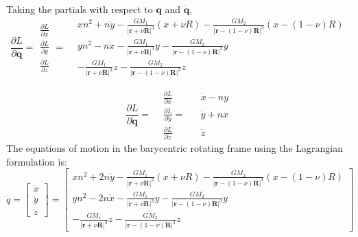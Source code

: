 \documentclass[]{aiaa-tc}%
\begin{document}
Taking the partials with respect to $\mathbf{q}$ and $\mathbf{\dot{q}}$,
\begin{equation}
\frac{\partial L}{\partial \mathbf{q}} =
\begin{aligned}
\frac{\partial L}{\partial {x}} \\ 
\frac{\partial L}{\partial {y}} \\ 
\frac{\partial L}{\partial {z}}
\end{aligned}
=
\begin{aligned} 
 &  xn^2+n\dot{y} - \frac{GM_1}{\left | \mathbf{r}+\nu \boldsymbol{\mathbf{R}}  \right |^3} \left ( x+\nu R \right ) - \frac{GM_2}{\left | \mathbf{r}-\left (1-\nu  \right ) \boldsymbol{\mathbf{R}} \right |^3}\left ( x-(1-\nu)R \right ) \\
& yn^2-n\dot{x} - \frac{GM_1}{\left | \mathbf{r}+\nu \boldsymbol{\mathbf{R}}  \right |^3}  y  - \frac{GM_2}{\left | \mathbf{r}-\left (1-\nu  \right ) \boldsymbol{\mathbf{R}} \right |^3} y \\
 & - \frac{GM_1}{\left | \mathbf{r}+\nu \boldsymbol{\mathbf{R}}  \right |^3}  z - \frac{GM_2}{\left | \mathbf{r}-\left (1-\nu  \right ) \boldsymbol{\mathbf{R}} \right |^3} z
\end{aligned}
\end{equation}

\begin{equation}
\frac{\partial L}{\partial \mathbf{\dot{q}}} =
\begin{aligned}
&\frac{\partial L}{\partial \dot{x}} && \dot{x}-ny\\ 
&\frac{\partial L}{\partial \dot{y}} =&& \dot{y}+nx\\ 
&\frac{\partial L}{\partial \dot{z}} && \dot{z}
\end{aligned}
\end{equation}
The equations of motion in the barycentric rotating frame using the Lagrangian formulation is:
\begin{equation}
\ddot{q}=\begin{bmatrix}
\ddot{x}\\ 
\ddot{y}\\ 
\ddot{z}
\end{bmatrix}
=
\begin{bmatrix}
xn^2+2n\dot{y} - \frac{GM_1}{\left | \mathbf{r}+\nu \boldsymbol{\mathbf{R}}  \right |^3} \left ( x+\nu R \right ) - \frac{GM_2}{\left | \mathbf{r}-\left (1-\nu  \right ) \boldsymbol{\mathbf{R}} \right |^3}\left ( x-(1-\nu)R \right )\\ 
yn^2-2n\dot{x} - \frac{GM_1}{\left | \mathbf{r}+\nu \boldsymbol{\mathbf{R}}  \right |^3}  y  - \frac{GM_2}{\left | \mathbf{r}-\left (1-\nu  \right ) \boldsymbol{\mathbf{R}} \right |^3} y\\ 
- \frac{GM_1}{\left | \mathbf{r}+\nu \boldsymbol{\mathbf{R}}  \right |^3}  z - \frac{GM_2}{\left | \mathbf{r}-\left (1-\nu  \right ) \boldsymbol{\mathbf{R}} \right |^3} z
\end{bmatrix}
\end{equation}
\end{document}
